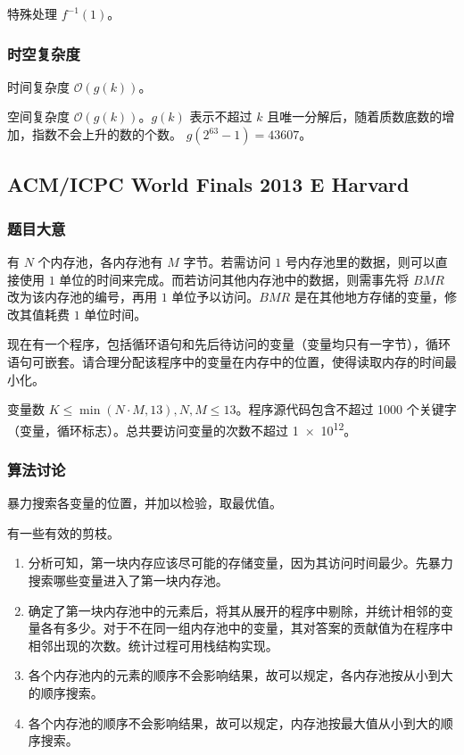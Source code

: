 				特殊处理 $f^{-1}(1)$。
			\subsubsection{时空复杂度}
				时间复杂度 $\mathcal{O}\left(g(k)\right)$。
				
				空间复杂度 $\mathcal{O}\left(g(k)\right)$。$g(k)$ 表示不超过 $k$ 且唯一分解后，随着质数底数的增加，指数不会上升的数的个数。 $g(2^{63}-1) = \num{43607}$。
			
		\newpage
		\subsection{ACM/ICPC World Finals 2013 E Harvard}
			\subsubsection{题目大意}
				有 $N$ 个内存池，各内存池有 $M$ 字节。若需访问 $1$ 号内存池里的数据，则可以直接使用 $1$ 单位的时间来完成。而若访问其他内存池中的数据，则需事先将 $BMR$ 改为该内存池的编号，再用 $1$ 单位予以访问。$BMR$ 是在其他地方存储的变量，修改其值耗费 $1$ 单位时间。
			
				现在有一个程序，包括循环语句和先后待访问的变量（变量均只有一字节），循环语句可嵌套。请合理分配该程序中的变量在内存中的位置，使得读取内存的时间最小化。
				
				变量数 $K \le \min (N\cdot M, 13), N,M \le 13$。程序源代码包含不超过 \num{1000} 个关键字（变量，循环标志）。总共要访问变量的次数不超过 \num{1e12}。
			\subsubsection{算法讨论}
				暴力搜索各变量的位置，并加以检验，取最优值。
				
				有一些有效的剪枝。
				\begin{enumerate}
					\item 分析可知，第一块内存应该尽可能的存储变量，因为其访问时间最少。先暴力搜索哪些变量进入了第一块内存池。
					\item 确定了第一块内存池中的元素后，将其从展开的程序中剔除，并统计相邻的变量各有多少。对于不在同一组内存池中的变量，其对答案的贡献值为在程序中相邻出现的次数。统计过程可用栈结构实现。
					\item 各个内存池内的元素的顺序不会影响结果，故可以规定，各内存池按从小到大的顺序搜索。
					\item 各个内存池的顺序不会影响结果，故可以规定，内存池按最大值从小到大的顺序搜索。
				\end{enumerate}
			
